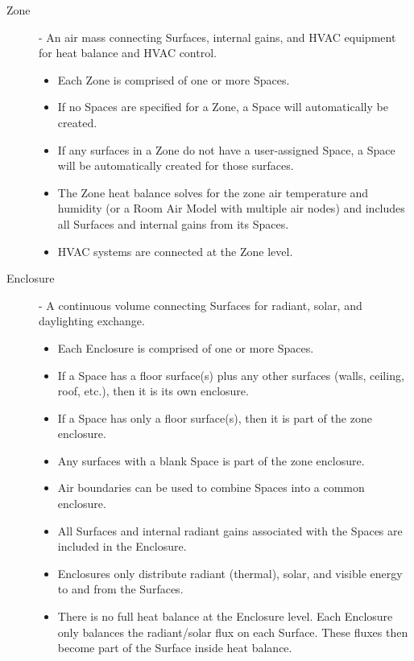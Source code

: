 \begin{description}
  \item[Zone] - An air mass connecting Surfaces, internal gains, and HVAC equipment for heat balance and HVAC control.
  \begin{itemize}
    \item
     Each Zone is comprised of one or more Spaces.
    \item
     If no Spaces are specified for a Zone, a Space will automatically be created.
    \item
     If any surfaces in a Zone do not have a user-assigned Space, a Space will be automatically created for those surfaces.
    \item
     The Zone heat balance solves for the zone air temperature and humidity (or a Room Air Model with multiple air nodes) and includes all Surfaces and internal gains from its Spaces. 
    \item
     HVAC systems are connected at the Zone level.
  \end{itemize}

  \item[Enclosure] - A continuous volume connecting Surfaces for radiant, solar, and daylighting exchange.
  \begin{itemize}
    \item
     Each Enclosure is comprised of one or more Spaces.
    \item
     If a Space has a floor surface(s) plus any other surfaces (walls, ceiling, roof, etc.), then it is its own enclosure.
    \item
     If a Space has only a floor surface(s), then it is part of the zone enclosure.
    \item
     Any surfaces with a blank Space is part of the zone enclosure.
    \item
     Air boundaries can be used to combine Spaces into a common enclosure.
    \item
     All Surfaces and internal radiant gains associated with the Spaces are included in the Enclosure.
    \item
     Enclosures only distribute radiant (thermal), solar, and visible energy to and from the Surfaces.
    \item
     There is no full heat balance at the Enclosure level. Each Enclosure only balances the radiant/solar flux on each Surface. These fluxes then become part of the Surface inside heat balance.
  \end{itemize}
\end{description}
